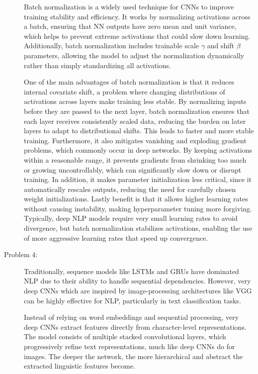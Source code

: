 \documentclass[10pt]{article}
\begin{document}
\begin{description}
Batch normalization is a widely used technique for CNNs to improve training stability and efficiency.
It works by normalizing activations across a batch, ensuring that NN outputs have zero mean and unit variance, 
which helps to prevent extreme activations that could slow down learning. 
Additionally, batch normalization includes trainable scale $\gamma$ and shift $\beta$  parameters, 
allowing the model to adjust the normalization dynamically rather than simply standardizing all activations.

One of the main advantages of batch normalization is that it reduces internal covariate shift, 
a problem where changing distributions of activations across layers make training less stable. 
By normalizing inputs before they are passed to the next layer, batch normalization ensures that each layer receives consistently scaled data, 
reducing the burden on later layers to adapt to distributional shifts. This leads to faster and more stable training.
Furthermore, it also mitigates vanishing and exploding gradient problems, which commonly occur in deep networks. 
By keeping activations within a reasonable range, it prevents gradients from shrinking too much or growing uncontrollably, 
which can significantly slow down or disrupt training. In addition, it makes parameter initialization less critical, 
since it automatically rescales outputs, reducing the need for carefully chosen weight initializations.
Lastly benefit is that it allows higher learning rates without causing instability, making hyperparameter tuning more forgiving. 
Typically, deep NLP models require very small learning rates to avoid divergence, but batch normalization stabilizes activations, 
enabling the use of more aggressive learning rates that speed up convergence.

\pagebreak

\item[Problem 4:]  \hfill %

Traditionally, sequence models like LSTMs and GRUs have dominated NLP due to their ability to handle sequential dependencies. 
However, very deep CNNs which are inspired by image-processing architectures like VGG can be highly effective for NLP, 
particularly in text classification tasks.

Instead of relying on word embeddings and sequential processing, very deep CNNs extract features directly from character-level representations. 
The model consists of multiple stacked convolutional layers, which progressively refine text representations, much like deep CNNs do for images. 
The deeper the network, the more hierarchical and abstract the extracted linguistic features become.


\end{description}
\end{document}
